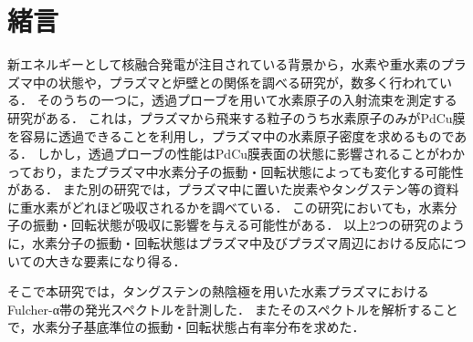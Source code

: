 \chapter{緒言}
新エネルギーとして核融合発電が注目されている背景から，水素や重水素のプラズマ中の状態や，プラズマと炉壁との関係を調べる研究が，数多く行われている．
そのうちの一つに，透過プローブを用いて水素原子の入射流束を測定する研究がある\cite{yun}．
これは，プラズマから飛来する粒子のうち水素原子のみがPdCu膜を容易に透過できることを利用し，プラズマ中の水素原子密度を求めるものである．
しかし，透過プローブの性能はPdCu膜表面の状態に影響されることがわかっており，またプラズマ中水素分子の振動・回転状態によっても変化する可能性がある．
また別の研究では，プラズマ中に置いた炭素やタングステン等の資料に重水素がどれほど吸収されるかを調べている\cite{kuzmin}．
この研究においても，水素分子の振動・回転状態が吸収に影響を与える可能性がある．
以上2つの研究のように，水素分子の振動・回転状態はプラズマ中及びプラズマ周辺における反応についての大きな要素になり得る．

そこで本研究では，タングステンの熱陰極を用いた水素プラズマにおけるFulcher-α帯の発光スペクトルを計測した．
またそのスペクトルを解析することで，水素分子基底準位の振動・回転状態占有率分布を求めた．
